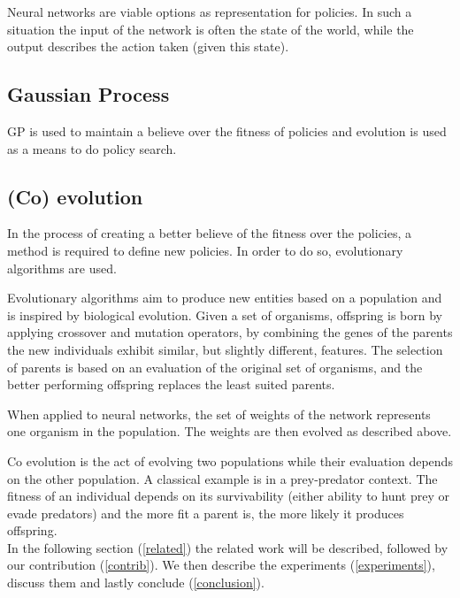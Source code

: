 Neural networks are viable options as representation for policies. In such a situation the input of the network is often the state of the world, while the output describes the action taken (given this state).

\subsection{Gaussian Process}

GP is used to maintain a believe over the fitness of policies and evolution is used as a means to do policy search.

\subsection{(Co) evolution}
In the process of creating a better believe of the fitness over the policies, a method is required to define new policies. In order to do so, evolutionary algorithms are used. 

Evolutionary algorithms aim to produce new entities based on a population and is inspired by biological evolution. Given a set of organisms, offspring is born by applying crossover and mutation operators, by combining the genes of the parents the new individuals exhibit similar, but slightly different, features. The selection of parents is based on an evaluation of the original set of organisms, and the better performing offspring replaces the least suited parents. 

When applied to neural networks, the set of weights of the network represents one organism in the population. The weights are then evolved as described above.

Co evolution is the act of evolving two populations while their evaluation depends on the other population. A classical example is in a prey-predator context. The fitness of an individual depends on its survivability (either ability to hunt prey or evade predators) and the more fit a parent is, the more likely it produces offspring. \\

In the following section (\ref{related}) the related work will be described, followed by our contribution (\ref{contrib}). We then describe the experiments (\ref{experiments}), discuss them and lastly conclude (\ref{conclusion}).

